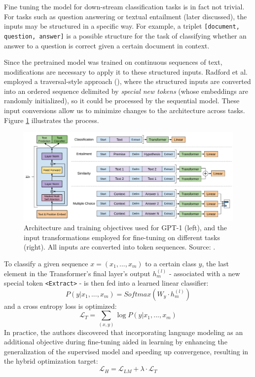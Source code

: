 \documentclass{article}
\begin{document}
\medskip
\noindent
Fine tuning the model for down-stream classification tasks is in fact not trivial. For tasks such as question answering or textual entailment (later discussed), the inputs may be structured in a specific way. For example, a triplet \texttt{[document, question, answer]} is a possible structure for the task of classifying whether an answer to a question is correct given a certain document in context.

\medskip
\noindent
Since the pretrained model was trained on continuous sequences of text, modifications are necessary to apply it to these structured inputs. Radford et al. employed a traversal-style approach (\citet{rocktaschel2015traversal}), where the structured inputs are converted into an ordered sequence delimited by \emph{special new tokens} (whose embeddings are randomly initialized), so it could be processed by the sequential model. These input conversions allow us to minimize changes to the architecture across tasks. Figure \ref{fig:gpt1_fig1} illustrates the process.

\begin{figure}[ht!]
    \begin{center}
        \includegraphics[clip, width=1.0\textwidth]{figures/gpt1_fig1.png}
    \end{center}
    \caption{
        Architecture and training objectives used for GPT-1 (left), and the input transformations employed for fine-tuning on different tasks (right). All inputs are converted into token sequences. Source: \citet{radford2018gpt1}.
    }
    \label{fig:gpt1_fig1}
\end{figure}

\medskip
\noindent
To classify a given sequence $x=(x_1,...,x_m)$ to a certain class $y$, the last element in the Transformer's final layer's output $h_m^{(l)}$ - associated with a new special token \texttt{<Extract>} - is then fed into a learned linear classifier:
\begin{equation*}
    P(y | x_1,...,x_m) = Softmax(W_y \cdot h_m^{(l)})
\end{equation*}
and a cross entropy loss is optimized:
\begin{equation*}
    \mathcal{L}_T=\sum_{(x,y)}\log P(y|x_1,...,x_m)
\end{equation*}
In practice, the authors discovered that incorporating language modeling as an additional objective during fine-tuning aided in learning by enhancing the generalization of the supervised model and speeding up convergence, resulting in the hybrid optimization target:
\begin{equation*}
    \mathcal{L}_H = \mathcal{L}_{LM} + \lambda \cdot \mathcal{L}_T
\end{equation*}
\end{document}
